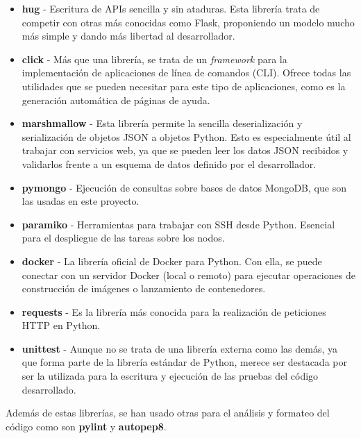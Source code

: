 \begin{itemize}
    \item \textbf{hug} - Escritura de APIs sencilla y sin ataduras. Esta
          librería trata de competir con otras más conocidas como Flask, proponiendo
          un modelo mucho más simple y dando más libertad al desarrollador.
    \item \textbf{click} - Más que una librería, se trata de un
          \textit{framework} para la implementación de aplicaciones de línea de
          comandos (CLI). Ofrece todas las utilidades que se pueden necesitar para
          este tipo de aplicaciones, como es la generación automática de páginas de
          ayuda.
    \item \textbf{marshmallow} - Esta librería permite la sencilla
          deserialización y serialización de objetos JSON a objetos Python. Esto es
          especialmente útil al trabajar con servicios web, ya que se pueden leer los
          datos JSON recibidos y validarlos frente a un esquema de datos definido por
          el desarrollador.
    \item \textbf{pymongo} - Ejecución de consultas sobre bases de datos
          MongoDB, que son las usadas en este proyecto.
    \item \textbf{paramiko} - Herramientas para trabajar con SSH desde Python.
          Esencial para el despliegue de las tareas sobre los nodos.
    \item \textbf{docker} - La librería oficial de Docker para Python. Con ella,
          se puede conectar con un servidor Docker (local o remoto) para ejecutar
          operaciones de construcción de imágenes o lanzamiento de contenedores.
    \item \textbf{requests} - Es la librería más conocida para la realización de
          peticiones HTTP en Python.
    \item \textbf{unittest} - Aunque no se trata de una librería externa como
          las demás, ya que forma parte de la librería estándar de Python, merece ser
          destacada por ser la utilizada para la escritura y ejecución de las pruebas
          del código desarrollado.
\end{itemize}

Además de estas librerías, se han usado otras para el análisis y formateo del
código como son \textbf{pylint} y \textbf{autopep8}.


